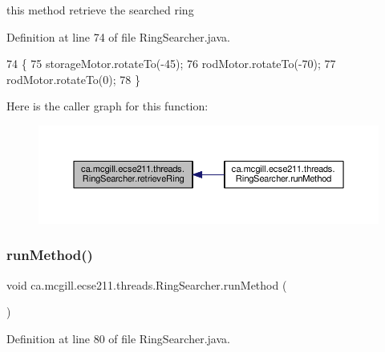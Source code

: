 this method retrieve the searched ring 

Definition at line 74 of file Ring\+Searcher.\+java.


\begin{DoxyCode}
74                              \{
75     storageMotor.rotateTo(-45);
76     rodMotor.rotateTo(-70);
77     rodMotor.rotateTo(0);
78   \}
\end{DoxyCode}
Here is the caller graph for this function\+:
\nopagebreak
\begin{figure}[H]
\begin{center}
\leavevmode
\includegraphics[width=350pt]{classca_1_1mcgill_1_1ecse211_1_1threads_1_1_ring_searcher_abd7a2651a7c5de76a018664c8bf327af_icgraph}
\end{center}
\end{figure}
\mbox{\label{classca_1_1mcgill_1_1ecse211_1_1threads_1_1_ring_searcher_a2b03c700b5d232f5aef7c6acf439b7ea}} 
\subsubsection{\texorpdfstring{run\+Method()}{runMethod()}}
{\footnotesize\ttfamily void ca.\+mcgill.\+ecse211.\+threads.\+Ring\+Searcher.\+run\+Method (\begin{DoxyParamCaption}{ }\end{DoxyParamCaption})\hspace{0.3cm}{\ttfamily [protected]}}



Definition at line 80 of file Ring\+Searcher.\+java.


